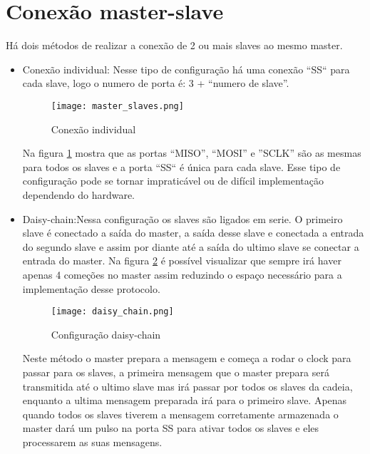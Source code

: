 \documentclass{article}
\begin{document}
    \section*{Conexão master-slave}
        Há dois métodos de realizar a conexão de 2 ou mais slaves ao mesmo master.
        \begin{itemize}
            \item
                Conexão individual: Nesse tipo de configuração há uma conexão “SS“ para cada slave, logo o numero de porta é: 3 + “numero de slave”.
                \begin{figure}[H]
                    \centering
                    \texttt{[image: master\_slaves.png]}
                    \caption{Conexão individual}
                    \label{fig:master_slaves}
                \end{figure}
                Na figura \ref{fig:master_slaves} mostra que as portas “MISO”, “MOSI” e ”SCLK” são as mesmas para todos os slaves e a porta “SS“ é única para cada slave. Esse tipo de configuração pode se tornar impraticável ou de difícil implementação dependendo do hardware.
            \item
                Daisy-chain:Nessa configuração os slaves são ligados em serie. O primeiro slave é conectado a saída do master, a saída desse slave e conectada a entrada do segundo slave e assim por diante até a saída do ultimo slave se conectar a entrada do master. Na figura \ref{fig:daisy_chain} é possível visualizar que sempre irá haver apenas 4 começões no master assim reduzindo o espaço necessário para a implementação desse protocolo.
                \begin{figure}[H]
                    \centering
                    \texttt{[image: daisy\_chain.png]}
                    \caption{Configuração daisy-chain}
                    \label{fig:daisy_chain}
                \end{figure}
                Neste método o master prepara a mensagem e começa a rodar o clock para passar para os slaves, a primeira mensagem que o master prepara será transmitida até o ultimo slave mas irá passar por todos os slaves da cadeia, enquanto a ultima mensagem preparada irá para o primeiro slave. Apenas quando todos os slaves tiverem a mensagem corretamente armazenada o master dará um pulso na porta SS para ativar todos os slaves e eles processarem as suas mensagens.
        \end{itemize}
\end{document}
